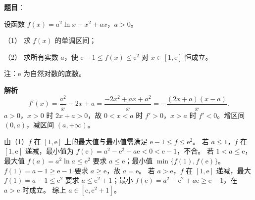 \begin{answer}

\textbf{题目}：

设函数 $f(x)=a^2\ln x-x^2+ax$，$a>0$。

（1） 求 $f(x)$ 的单调区间；

（2） 求所有实数 $a$，使 $\mathrm e-1\leqslant f(x)\leqslant\mathrm e^2$ 对 $x\in[1,\mathrm e]$ 恒成立。

注：$\mathrm e$ 为自然对数的底数。

\textbf{解析}
\nopagebreak[4]
\[f'(x)=\frac{a^2}{x}-2x+a=\frac{-2x^2+ax+a^2}{x}=-\frac{(2x+a)(x-a)}x.\]
$a>0$，$x>0$ 时 $2x+a>0$，故 $0<x<a$ 时 $f'>0$，$x>a$ 时 $f'<0$。增区间 $(0,a)$，减区间 $(a,+\infty)$。

由（1）$f$ 在 $[1,\mathrm e]$ 上的最大值与最小值需满足 $\mathrm e-1\leqslant f\leqslant\mathrm e^2$。
若 $a\leqslant1$，$f$ 在 $[1,\mathrm e]$ 递减，最小值为 $f(\mathrm e)=a^2-\mathrm e^2+a\mathrm e<0<\mathrm e-1$，不合。
若 $1<a\leqslant\mathrm e$，最大值 $f(a)=a^2\ln a\leqslant\mathrm e^2$ 要求 $a\leqslant\mathrm e$；最小值 $\min\{f(1),f(\mathrm e)\}$。$f(1)=a-1\geqslant\mathrm e-1$ 要求 $a\geqslant\mathrm e$，故 $a=\mathrm e$。
若 $a>\mathrm e$，$f$ 在 $[1,\mathrm e]$ 递减，最大 $f(1)=a-1\leqslant\mathrm e^2$ 要求 $a\leqslant\mathrm e^2+1$；最小 $f(\mathrm e)=a^2-\mathrm e^2+a\mathrm e\geqslant\mathrm e-1$，在 $a>\mathrm e$ 时成立。
综上 $a\in[\mathrm e,\mathrm e^2+1]$。



\end{answer}
